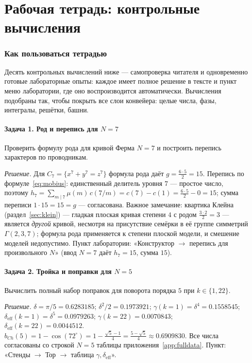 \part{Рабочая тетрадь: контрольные вычисления}

\section{Как пользоваться тетрадью}\label{sec:workbook}

Десять контрольных вычислений ниже --- самопроверка читателя и
одновременно готовые лабораторные опыты: каждое имеет полное
решение в тексте и пункт меню лаборатории, где оно воспроизводится
автоматически. Вычисления подобраны так, чтобы покрыть все слои
конвейера: целые числа, фазы, интегралы, решётки, башни.

\subsection*{Задача 1. Род и перепись для $N=7$}
Проверить формулу рода для кривой Ферма $N=7$ и построить перепись
характеров по проводникам.

\emph{Решение.} Для $C_7=\{x^7+y^7=z^7\}$ формула рода даёт
$g=\tfrac{6\cdot5}2=15$. Перепись по формуле~\eqref{eq:mobius}:
единственный делитель уровня $7$ --- простое число, поэтому
$h_7=\sum_{m\mid7}\mu(m)\,c(7/m)=c(7)-c(1)
=\tfrac{6\cdot5}2-0=15$; сумма переписи $1\cdot15=15=g$ ---
согласована. Важное замечание: квартика Клейна
(раздел~\ref{sec:klein}) --- гладкая плоская кривая степени $4$ с
родом $\tfrac{3\cdot2}2=3$ --- является \emph{другой} кривой,
несмотря на присутствие семёрки в её группе симметрий
$\Gamma(2,3,7)$; формула рода применяется к степени плоской
модели, и смешение моделей недопустимо. Пункт лаборатории:
«Конструктор $\to$ перепись для произвольного $N$» (ввод $N=7$
даёт $h_7=15$, сумма $15$).

\subsection*{Задача 2. Тройка и поправки для $N=5$}
Вычислить полный набор поправок для поворота порядка $5$ при
$k\in\{1,22\}$.

\emph{Решение.} $\delta=\pi/5=0.6283185$; $\delta^2/2=0.1973921$;
$\gamma(k{=}1)=\delta^4=0.1558545$; $\delta_{\mathrm{eff}}(k{=}1)
=\delta^5=0.0979263$; $\gamma(k{=}22)=0.0070843$;
$\delta_{\mathrm{eff}}(k{=}22)=0.0044512$.
$b_{Ch}(5)=1-\cos(72^\circ)=1-\tfrac{\sqrt5-1}4
=\tfrac{5-\sqrt5}4\approx0.6909830$. Все числа согласованы со
строкой $N=5$ таблицы приложения~\ref{app:fulldata}. Пункт:
«Стенды $\to$ Тор $\to$ таблица $\gamma,\delta_{\mathrm{eff}}$».

